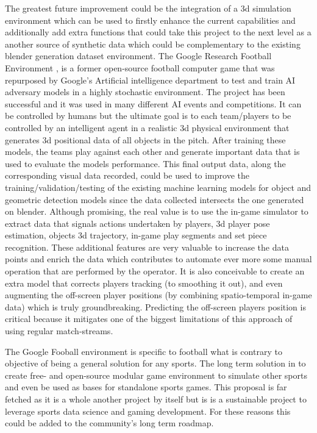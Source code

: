 \documentclass[
11pt,
twoside
]{report}
\begin{document}
The greatest future improvement could be the integration of a 3d simulation environment which can be used to firstly enhance the current capabilities and additionally add extra functions that could take this project to the next level as a another source of synthetic data which could be complementary to the existing blender generation dataset environment. The Google Research Football Environment \cite{gfootball_env}, is a former open-source football computer game that was repurposed by Google's Artificial intelligence department to test and train AI adversary models in a highly stochastic environment. The project has been successful and it was used in many different AI events and competitions. It can be controlled by humans but the ultimate goal is to each team/players to be controlled by an intelligent agent in a realistic 3d physical environment that generates 3d positional data of all objects in the pitch. After training these models, the teams play against each other and generate important data that is used to evaluate the models performance. This final output data, along the corresponding visual data recorded, could be used to improve the training/validation/testing of the existing machine learning models for object and geometric detection models since the data collected intersects the one generated on blender. Although promising, the real value is to use the in-game simulator to extract data that signals actions undertaken by players, 3d player pose estimation, objects 3d trajectory, in-game play segments and set piece recognition. These additional features are very valuable to increase the data points and enrich the data which contributes to automate ever more some manual operation that are performed by the operator. It is also conceivable to create an extra model that corrects players tracking (to smoothing it out), and even augmenting the off-screen player positions (by combining spatio-temporal in-game data) which is truly groundbreaking. Predicting the off-screen players position is critical because it mitigates one of the biggest limitations of this approach of using regular match-streams.


The Google Fooball environment \cite{gfootball_env} is specific to football what is contrary to objective of being a general solution for any sports. The long term solution in to create free- and open-source modular game environment to simulate other sports and even be used as bases for standalone sports games. This proposal is far fetched as it is a whole another project by itself but is is a sustainable project to leverage sports data science and gaming development. For these reasons this could be added to the community's long term roadmap.
\end{document}
